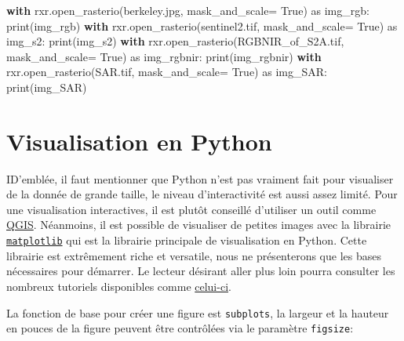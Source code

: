 \documentclass[
  11pt,
  letterpaper,
  open=any,
  twoside=false,
  french]{scrbook}
\newenvironment{Shaded}{\begin{snugshade}}{\end{snugshade}}
\newcommand{\BuiltInTok}[1]{\textcolor[rgb]{0.00,0.23,0.31}{#1}}
\newcommand{\ControlFlowTok}[1]{\textcolor[rgb]{0.00,0.23,0.31}{\textbf{#1}}}
\newcommand{\ImportTok}[1]{\textcolor[rgb]{0.00,0.46,0.62}{#1}}
\newcommand{\NormalTok}[1]{\textcolor[rgb]{0.00,0.23,0.31}{#1}}
\newcommand{\OperatorTok}[1]{\textcolor[rgb]{0.37,0.37,0.37}{#1}}
\newcommand{\StringTok}[1]{\textcolor[rgb]{0.13,0.47,0.30}{#1}}
\newcommand{\VariableTok}[1]{\textcolor[rgb]{0.07,0.07,0.07}{#1}}
\begin{document}
\begin{Shaded}
\begin{Highlighting}[]
\ControlFlowTok{with}\NormalTok{ rxr.open\_rasterio(}\StringTok{\textquotesingle{}berkeley.jpg\textquotesingle{}}\NormalTok{, mask\_and\_scale}\OperatorTok{=} \VariableTok{True}\NormalTok{) }\ImportTok{as}\NormalTok{ img\_rgb:}
    \BuiltInTok{print}\NormalTok{(img\_rgb)}
\ControlFlowTok{with}\NormalTok{ rxr.open\_rasterio(}\StringTok{\textquotesingle{}sentinel2.tif\textquotesingle{}}\NormalTok{, mask\_and\_scale}\OperatorTok{=} \VariableTok{True}\NormalTok{) }\ImportTok{as}\NormalTok{ img\_s2:}
    \BuiltInTok{print}\NormalTok{(img\_s2)}
\ControlFlowTok{with}\NormalTok{ rxr.open\_rasterio(}\StringTok{\textquotesingle{}RGBNIR\_of\_S2A.tif\textquotesingle{}}\NormalTok{, mask\_and\_scale}\OperatorTok{=} \VariableTok{True}\NormalTok{) }\ImportTok{as}\NormalTok{ img\_rgbnir:}
    \BuiltInTok{print}\NormalTok{(img\_rgbnir)}
\ControlFlowTok{with}\NormalTok{ rxr.open\_rasterio(}\StringTok{\textquotesingle{}SAR.tif\textquotesingle{}}\NormalTok{, mask\_and\_scale}\OperatorTok{=} \VariableTok{True}\NormalTok{) }\ImportTok{as}\NormalTok{ img\_SAR:}
    \BuiltInTok{print}\NormalTok{(img\_SAR)}
\end{Highlighting}
\end{Shaded}

\section{Visualisation en Python}\label{visualisation-en-python}

ID'emblée, il faut mentionner que Python n'est pas vraiment fait pour
visualiser de la donnée de grande taille, le niveau d'interactivité est
aussi assez limité. Pour une visualisation interactives, il est plutôt
conseillé d'utiliser un outil comme \href{https://qgis.org/}{QGIS}.
Néanmoins, il est possible de visualiser de petites images avec la
librairie \href{https://matplotlib.org/stable/}{\texttt{matplotlib}} qui
est la librairie principale de visualisation en Python. Cette librairie
est extrêmement riche et versatile, nous ne présenterons que les bases
nécessaires pour démarrer. Le lecteur désirant aller plus loin pourra
consulter les nombreux tutoriels disponibles comme
\href{https://matplotlib.org/stable/tutorials/index.html}{celui-ci}.

La fonction de base pour créer une figure est \texttt{subplots}, la
largeur et la hauteur en pouces de la figure peuvent être contrôlées via
le paramètre \texttt{figsize}:
\end{document}
